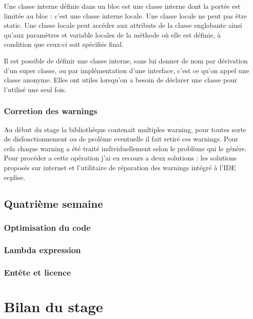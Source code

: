 \documentclass[12pt]{report}
\begin{document}
Une classe interne définie dans un bloc est une classe interne dont la portée est limitée au bloc : c’est une classe interne locale. Une classe locale ne peut pas être static. Une classe locale peut accéder aux attributs de la classe englobante ainsi qu'aux paramètres et variable locales de la méthode où elle est définie, à condition que ceux-ci soit spécifiés final.\newline 

Il est possible de définir une classe interne, sans lui donner de nom par dérivation d’un super classe, ou par implémentation d’une interface, c'est ce qu'on appel une classe anonyme. Elles ont utiles lorsqu'on a besoin de déclarer une classe pour l'utilisé une seul fois.


\subsubsection{Corretion des warnings}

Au début du stage la bibliothèque contenait multiples warning, pour toutes sorte de disfonctionnement ou de prolème eventuelle il fait retiré ces warnings. Pour cela chaque warning a été traité individuellement selon le problème qui le génère. Pour procéder a cette opération j'ai eu recours a deux solutions : les solutions proposés sur internet et l'utilitaire de réparation des warnings intégré à l'IDE ecplise.
~\\

\subsection{Quatrième semaine}
\subsubsection{Optimisation du code}
\subsubsection{Lambda expression}
\subsubsection{Entête et licence}

\section{Bilan du stage}

\newpage
\end{document}
